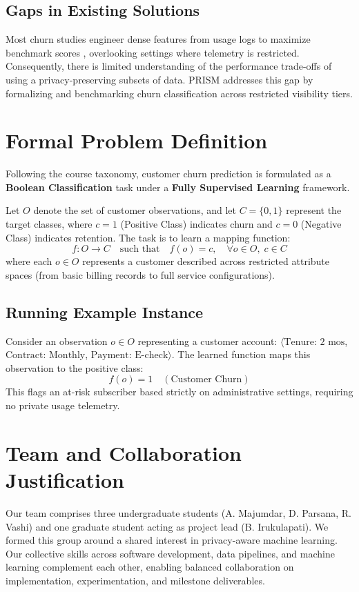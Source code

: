 \documentclass[sigconf,nonacm]{acmart}
\begin{document}
\subsection{Gaps in Existing Solutions}
Most churn studies engineer dense features from usage logs to maximize benchmark scores \cite{verbeke2012building}, overlooking settings where telemetry is restricted. Consequently, there is limited understanding of the performance trade-offs of using a privacy-preserving subsets of data. PRISM addresses this gap by formalizing and benchmarking churn classification across restricted visibility tiers.

\section{Formal Problem Definition}
\label{sec:formal_problem}
Following the course taxonomy, customer churn prediction is formulated as a \textbf{Boolean Classification} task under a \textbf{Fully Supervised Learning} framework.

Let $O$ denote the set of customer observations, and let $C = \{0, 1\}$ represent the target classes, where $c = 1$ (Positive Class) indicates churn and $c = 0$ (Negative Class) indicates retention. The task is to learn a mapping function:
\begin{equation}
    f: O \rightarrow C \quad \text{such that} \quad f(o) = c, \quad \forall o \in O, \; c \in C
\end{equation}
where each $o \in O$ represents a customer described across restricted attribute spaces (from basic billing records to full service configurations).

\subsection{Running Example Instance}
Consider an observation $o \in O$ representing a customer account: $\langle\text{Tenure: 2 mos}$, $\text{Contract: Monthly}$, $\text{Payment: E-check}\rangle$. The learned function maps this observation to the positive class:
\begin{equation*}
    f(o) = 1 \quad (\text{Customer Churn})
\end{equation*}
This flags an at-risk subscriber based strictly on administrative settings, requiring no private usage telemetry.

\section{Team and Collaboration Justification}
Our team comprises three undergraduate students (A. Majumdar, D. Parsana, R. Vashi) and one graduate student acting as project lead (B. Irukulapati). We formed this group around a shared interest in privacy-aware machine learning. Our collective skills across software development, data pipelines, and machine learning complement each other, enabling balanced collaboration on implementation, experimentation, and milestone deliverables.
\end{document}
